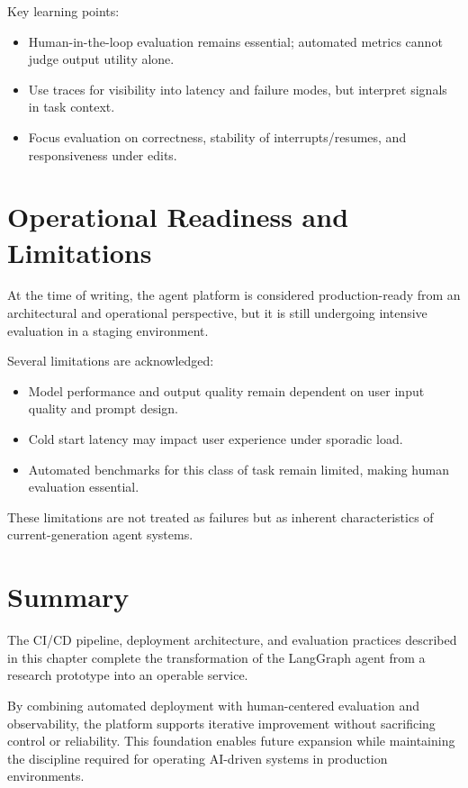 Key learning points:
\begin{itemize}
      \item Human-in-the-loop evaluation remains essential; automated metrics cannot judge output utility alone.
      \item Use traces for visibility into latency and failure modes, but interpret signals in task context.
      \item Focus evaluation on correctness, stability of interrupts/resumes, and responsiveness under edits.
\end{itemize}

\section{Operational Readiness and Limitations}
\label{sec:OperationalReadiness}

At the time of writing, the agent platform is considered production-ready from
an architectural and operational perspective, but it is still undergoing
intensive evaluation in a staging environment.

Several limitations are acknowledged:

\begin{itemize}
      \item Model performance and output quality remain dependent on user input
            quality and prompt design.
      \item Cold start latency may impact user experience under sporadic load.
      \item Automated benchmarks for this class of task remain limited, making
            human evaluation essential.
\end{itemize}

These limitations are not treated as failures but as inherent characteristics
of current-generation agent systems.

\section{Summary}
\label{sec:CICDSummary}

The CI/CD pipeline, deployment architecture, and evaluation practices described
in this chapter complete the transformation of the LangGraph agent from a
research prototype into an operable service.

By combining automated deployment with human-centered evaluation and
observability, the platform supports iterative improvement without sacrificing
control or reliability. This foundation enables future expansion while
maintaining the discipline required for operating AI-driven systems in
production environments.